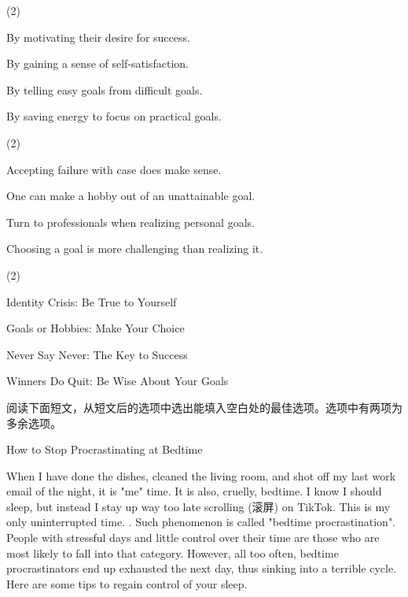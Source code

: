 \documentclass{英语试卷}
\begin{document}
\begin{choices}(2)
  \item By motivating their desire for success.
  \item By gaining a sense of self-satisfaction.
  \item By telling easy goals from difficult goals.
  \item By saving energy to focus on practical goals.
\end{choices}
\begin{choices}(2)
  \item Accepting failure with case does make sense.
  \item One can make a hobby out of an unattainable goal.
  \item Turn to professionals when realizing personal goals.
  \item Choosing a goal is more challenging than realizing it.
\end{choices}
\begin{choices}(2)
  \item Identity Crisis: Be True to Yourself
  \item Goals or Hobbies: Make Your Choice
  \item Never Say Never: The Key to Success
  \item Winners Do Quit: Be Wise About Your Goals
\end{choices}
\par 阅读下面短文，从短文后的选项中选出能填入空白处的最佳选项。选项中有两项为多余选项。\par
\par How to Stop Procrastinating at Bedtime\par
\par When I have done the dishes, cleaned the living room, and shot off my last work email of the night, it is "me" time. It is also, cruelly, bedtime. I know I should sleep, but instead I stay up way too late scrolling (滚屏) on TikTok. This is my only uninterrupted time. . Such phenomenon is called "bedtime procrastination". People with stressful days and little control over their time are those who are most likely to fall into that category. However, all too often, bedtime procrastinators end up exhausted the next day, thus sinking into a terrible cycle. Here are some tips to regain control of your sleep.\par
\end{document}
